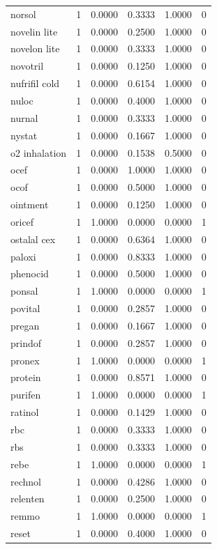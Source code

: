 \begin{longtable}{p{3.0cm}rrrrr}
norsol & 1 & 0.0000 & 0.3333 & 1.0000 & 0 \\
novelin lite & 1 & 0.0000 & 0.2500 & 1.0000 & 0 \\
novelon lite & 1 & 0.0000 & 0.3333 & 1.0000 & 0 \\
novotril & 1 & 0.0000 & 0.1250 & 1.0000 & 0 \\
nufrifil cold & 1 & 0.0000 & 0.6154 & 1.0000 & 0 \\
nuloc & 1 & 0.0000 & 0.4000 & 1.0000 & 0 \\
nurnal & 1 & 0.0000 & 0.3333 & 1.0000 & 0 \\
nystat & 1 & 0.0000 & 0.1667 & 1.0000 & 0 \\
o2 inhalation & 1 & 0.0000 & 0.1538 & 0.5000 & 0 \\
ocef & 1 & 0.0000 & 1.0000 & 1.0000 & 0 \\
ocof & 1 & 0.0000 & 0.5000 & 1.0000 & 0 \\
ointment & 1 & 0.0000 & 0.1250 & 1.0000 & 0 \\
oricef & 1 & 1.0000 & 0.0000 & 0.0000 & 1 \\
ostalal cex & 1 & 0.0000 & 0.6364 & 1.0000 & 0 \\
paloxi & 1 & 0.0000 & 0.8333 & 1.0000 & 0 \\
phenocid & 1 & 0.0000 & 0.5000 & 1.0000 & 0 \\
ponsal & 1 & 1.0000 & 0.0000 & 0.0000 & 1 \\
povital & 1 & 0.0000 & 0.2857 & 1.0000 & 0 \\
pregan & 1 & 0.0000 & 0.1667 & 1.0000 & 0 \\
prindof & 1 & 0.0000 & 0.2857 & 1.0000 & 0 \\
pronex & 1 & 1.0000 & 0.0000 & 0.0000 & 1 \\
protein & 1 & 0.0000 & 0.8571 & 1.0000 & 0 \\
purifen & 1 & 1.0000 & 0.0000 & 0.0000 & 1 \\
ratinol & 1 & 0.0000 & 0.1429 & 1.0000 & 0 \\
rbc & 1 & 0.0000 & 0.3333 & 1.0000 & 0 \\
rbs & 1 & 0.0000 & 0.3333 & 1.0000 & 0 \\
rebe & 1 & 1.0000 & 0.0000 & 0.0000 & 1 \\
rechnol & 1 & 0.0000 & 0.4286 & 1.0000 & 0 \\
relenten & 1 & 0.0000 & 0.2500 & 1.0000 & 0 \\
remmo & 1 & 1.0000 & 0.0000 & 0.0000 & 1 \\
reset & 1 & 0.0000 & 0.4000 & 1.0000 & 0 \\

\end{longtable}

